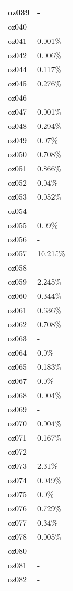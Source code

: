 \documentclass{article}%
\begin{document}
\begin{longtabu}{X[l] X[r]}
\hline%
oz039&{-}\\%
\hline%
oz040&{-}\\%
\hline%
oz041&0.001\%\\%
\hline%
oz042&0.006\%\\%
\hline%
oz044&0.117\%\\%
\hline%
oz045&0.276\%\\%
\hline%
oz046&{-}\\%
\hline%
oz047&0.001\%\\%
\hline%
oz048&0.294\%\\%
\hline%
oz049&0.07\%\\%
\hline%
oz050&0.708\%\\%
\hline%
oz051&0.866\%\\%
\hline%
oz052&0.04\%\\%
\hline%
oz053&0.052\%\\%
\hline%
oz054&{-}\\%
\hline%
oz055&0.09\%\\%
\hline%
oz056&{-}\\%
\hline%
oz057&10.215\%\\%
\hline%
oz058&{-}\\%
\hline%
oz059&2.245\%\\%
\hline%
oz060&0.344\%\\%
\hline%
oz061&0.636\%\\%
\hline%
oz062&0.708\%\\%
\hline%
oz063&{-}\\%
\hline%
oz064&0.0\%\\%
\hline%
oz065&0.183\%\\%
\hline%
oz067&0.0\%\\%
\hline%
oz068&0.004\%\\%
\hline%
oz069&{-}\\%
\hline%
oz070&0.004\%\\%
\hline%
oz071&0.167\%\\%
\hline%
oz072&{-}\\%
\hline%
oz073&2.31\%\\%
\hline%
oz074&0.049\%\\%
\hline%
oz075&0.0\%\\%
\hline%
oz076&0.729\%\\%
\hline%
oz077&0.34\%\\%
\hline%
oz078&0.005\%\\%
\hline%
oz080&{-}\\%
\hline%
oz081&{-}\\%
\hline%
oz082&{-}\\%

\end{longtabu}
\end{document}
